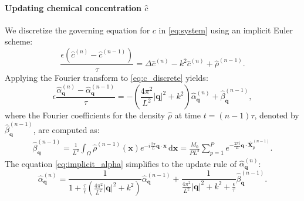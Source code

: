 \documentclass[review,onefignum,onetabnum]{siamart250211}
\begin{document}
\paragraph{Updating chemical concentration \(\hat{c}\)} 
\label{par:updating_c}
We discretize the governing equation for \(c\) in \eqref{eq:system} using an implicit Euler scheme:
\begin{equation}
\label{eq:c_discrete}
\frac{\epsilon(\hat{c}^{(n)}-\hat{c}^{(n-1)})}{\tau} = \Delta \hat{c}^{(n)} -k^2 \hat{c}^{(n)} +\hat{\rho}^{(n-1)}.
\end{equation}
Applying the Fourier transform to \eqref{eq:c_discrete} yields:
\begin{equation}
\epsilon \frac{\hat{\alpha}_{\mathbf{q}}^{(n)} - \hat{\alpha}_{\mathbf{q}}^{(n-1)}}{\tau} = -\left(\frac{4\pi^2}{L^2} |\mathbf{q}|^2 + k^2\right) \hat{\alpha}_{\mathbf{q}}^{(n)} + \hat{\beta}_{\mathbf{q}}^{(n-1)},
\label{eq:implicit_alpha}
\end{equation}
where the Fourier coefficients for the density \(\hat{\rho}\) at time $t=(n-1)\tau$, denoted by \(\hat{\beta}_{\mathbf{q}}^{(n-1)}\), are computed as:
\begin{equation}
\label{eq:beta_hat_comp}
\begin{aligned}
\hat{\beta}_{\mathbf{q}}^{(n-1)} = \frac{1}{L^3} \int_{\Omega} \hat{\rho}^{(n-1)}(\mathbf{x}) e^{-i \frac{2\pi}{L} \mathbf{q} \cdot \mathbf{x}} \, \mathrm{d}\mathbf{x}=\frac{M_0}{PL^3} \sum_{p=1}^{P} e^{-\frac{2\pi i}{L}\mathbf{q} \cdot \widehat{\mathbf{X}}_p^{(n-1)}}.
\end{aligned}
\end{equation}
The equation \eqref{eq:implicit_alpha} simplifies to the update rule of \(\hat{\alpha}_{\mathbf{q}}^{(n)}\):
\begin{equation}
\hat{\alpha}_{\mathbf{q}}^{(n)} = \frac{1}{1 + \frac{\tau}{\epsilon}\left(\frac{4\pi^2}{L^2} |\mathbf{q}|^2 + k^2\right)} \hat{\alpha}_{\mathbf{q}}^{(n-1)} + \frac{1}{\frac{4\pi^2}{L^2} |\mathbf{q}|^2 + k^2 + \frac{\epsilon}{\tau}} \hat{\beta}_{\mathbf{q}}^{(n-1)}.
\label{eq:alpha_hat_update}
\end{equation}
\end{document}

